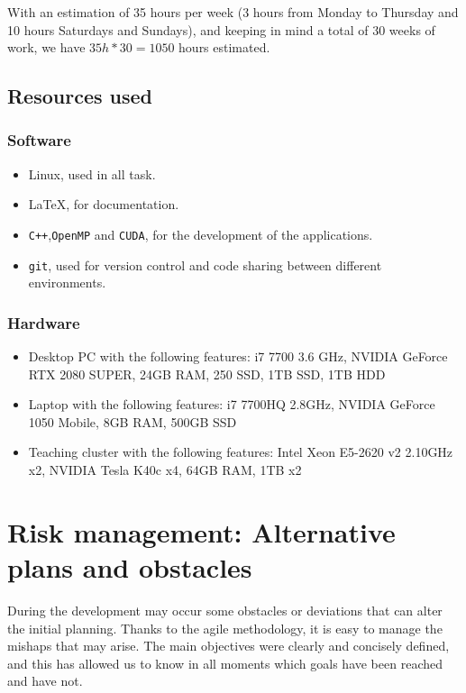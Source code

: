 \documentclass[titlepage,12pt]{report}
\begin{document}
With an estimation of 35 hours per week (3 hours from Monday to Thursday and 10 hours Saturdays and Sundays), and keeping in mind a total of 30 weeks of work, we have $35h*30 = 1050$ hours estimated.

\subsection{Resources used}

\subsubsection{Software}

\begin{itemize}
	\item Linux, used in all task.
	\item \LaTeX , for documentation.
	\item \texttt{C++},\texttt{OpenMP} and \texttt{CUDA}, for the development of the applications.
	\item \texttt{git}, used for version control and code sharing between different environments.
\end{itemize}

\subsubsection{Hardware}

\begin{itemize}
	\item Desktop PC with the following features: i7 7700 3.6 GHz, NVIDIA GeForce RTX 2080 SUPER, 24GB RAM, 250 SSD, 1TB SSD, 1TB HDD
	\item Laptop with the following features: i7 7700HQ 2.8GHz, NVIDIA GeForce 1050 Mobile, 8GB RAM, 500GB SSD
	\item Teaching cluster with the following features: Intel Xeon E5-2620 v2 2.10GHz x2, NVIDIA Tesla K40c x4, 64GB RAM, 1TB x2
\end{itemize}

\section{Risk management: Alternative plans and obstacles}

During the development may occur some obstacles or deviations that can alter the initial planning. Thanks to the agile methodology, it is easy to manage the mishaps that may arise. The main objectives were clearly and concisely defined, and this has allowed us to know in all moments which goals have been reached and have not.
\end{document}
